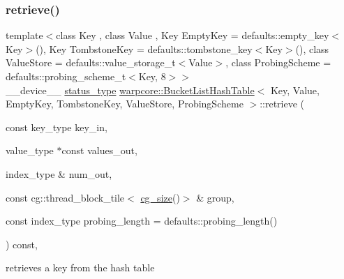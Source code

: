 \subsubsection{\texorpdfstring{retrieve()}{retrieve()}\hspace{0.1cm}{\footnotesize\ttfamily [1/2]}}
{\footnotesize\ttfamily template$<$class Key , class Value , Key Empty\+Key = defaults\+::empty\+\_\+key$<$\+Key$>$(), Key Tombstone\+Key = defaults\+::tombstone\+\_\+key$<$\+Key$>$(), class Value\+Store  = defaults\+::value\+\_\+storage\+\_\+t$<$\+Value$>$, class Probing\+Scheme  = defaults\+::probing\+\_\+scheme\+\_\+t$<$\+Key, 8$>$$>$ \\
\+\_\+\+\_\+device\+\_\+\+\_\+ \hyperlink{classwarpcore_1_1Status}{status\+\_\+type} \hyperlink{classwarpcore_1_1BucketListHashTable}{warpcore\+::\+Bucket\+List\+Hash\+Table}$<$ Key, Value, Empty\+Key, Tombstone\+Key, Value\+Store, Probing\+Scheme $>$\+::retrieve (\begin{DoxyParamCaption}\item[{const key\+\_\+type}]{key\+\_\+in,  }\item[{value\+\_\+type $\ast$const}]{values\+\_\+out,  }\item[{index\+\_\+type \&}]{num\+\_\+out,  }\item[{const cg\+::thread\+\_\+block\+\_\+tile$<$ \hyperlink{classwarpcore_1_1BucketListHashTable_a3807ac1b39b47617d862c5dd17f21330}{cg\+\_\+size}()$>$ \&}]{group,  }\item[{const index\+\_\+type}]{probing\+\_\+length = {\ttfamily defaults\+:\+:probing\+\_\+length()} }\end{DoxyParamCaption}) const\hspace{0.3cm}{\ttfamily [inline]}, {\ttfamily [noexcept]}}



retrieves a key from the hash table 


